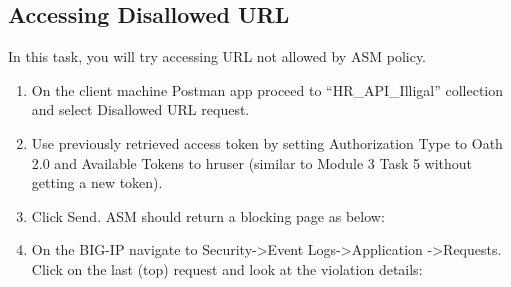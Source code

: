 \documentclass[letterpaper,10pt,english]{sphinxmanual}
\begin{document}
\subsection{Accessing Disallowed URL}
\label{\detokenize{class1/module4/module4:accessing-disallowed-url}}
In this task, you will try accessing URL not allowed by ASM policy.
\begin{enumerate}
\item {} 
On the client machine Postman app proceed to “HR\_API\_Illigal” collection and select Disallowed URL request.

\item {} 
Use previously retrieved access token by setting Authorization Type
to Oath 2.0 and Available Tokens to hruser (similar to Module 3 Task
5 without getting a new token).

\item {} 
Click Send. ASM should return a blocking page as below:

\end{enumerate}
\begin{quote}

\noindent{}
\end{quote}
\begin{enumerate}
\setcounter{enumi}{3}
\item {} 
On the BIG-IP navigate to Security-\textgreater{}Event Logs-\textgreater{}Application
-\textgreater{}Requests. Click on the last (top) request and look at the violation
details:

\end{enumerate}
\begin{quote}

\noindent{}
\end{quote}
\end{document}
